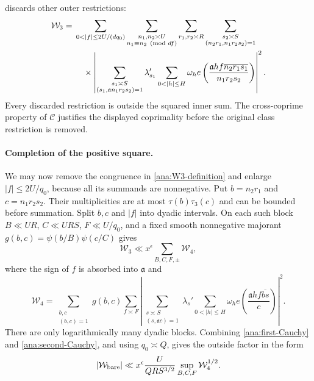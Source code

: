 discards other outer restrictions:
\begin{align}\label{ana:W3-definition}
 \mathcal W_3={}&
 \sum_{0<|f|\le2U/(dq_0)}
 \sum_{\substack{n_1,n_2\asymp U\\n_1\equiv n_2\pmod{df}}}
 \sum_{r_1,r_2\asymp R}
 \sum_{\substack{s_2\asymp S\\(n_2r_1,n_1r_2s_2)=1}}\notag\\
 &\quad\times
 \left|\sum_{\substack{s_1\asymp S\\(s_1,\mathfrak{a}n_1r_2s_2)=1}}
 \lambda_{s_1}'\sum_{0<|h|\le H}\omega_h
 e\left(\frac{\mathfrak{a}hf\overline{n_2r_1s_1}}{n_1r_2s_2}\right)
 \right|^2.
\end{align}
Every discarded restriction is outside the squared inner sum. The
cross-coprime property of $\mathcal C$ justifies the displayed
coprimality before the original class restriction is removed.

\paragraph{Completion of the positive square.}
We may now remove the congruence in \eqref{ana:W3-definition}
and enlarge $|f|\le2U/q_0$, because all its summands are nonnegative.
Put $b=n_2r_1$ and $c=n_1r_2s_2$. Their multiplicities are at most
$\tau(b)\tau_3(c)$ and can be bounded before summation.
Split $b,c$ and $|f|$ into dyadic intervals. On each such block
$B\ll UR$, $C\ll URS$, $F\ll U/q_0$, and a fixed smooth
nonnegative majorant $g(b,c)=\psi(b/B)\psi(c/C)$ gives
\begin{equation}\label{ana:second-Cauchy}
 \mathcal W_3\ll x^\epsilon\sum_{B,C,F,\pm}\mathcal W_4,
\end{equation}
where the sign of $f$ is absorbed into $\mathfrak{a}$ and
\begin{equation}\label{ana:W4-definition}
 \mathcal W_4=
 \sum_{\substack{b,c\\(b,c)=1}}g(b,c)
 \sum_{f\asymp F}
 \left|\sum_{\substack{s\asymp S\\(s,\mathfrak{a}c)=1}}
 \lambda_s'\sum_{0<|h|\le H}\omega_h
 e\left(\frac{\mathfrak{a}hf\overline{bs}}c\right)\right|^2.
\end{equation}
There are only logarithmically many dyadic blocks. Combining
\eqref{ana:first-Cauchy} and \eqref{ana:second-Cauchy}, and using
$q_0\asymp Q$, gives the outside factor in the form
\begin{equation}\label{ana:bare-Cauchy-factor}
 |\mathcal W_{\rm bare}|
 \ll x^\epsilon\frac{U}{QRS^{3/2}}
       \sup_{B,C,F}\mathcal W_4^{1/2}.
\end{equation}

